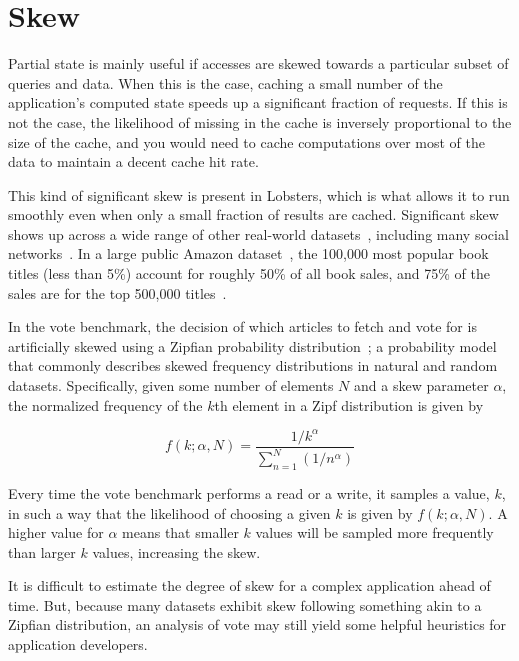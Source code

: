 \section{Skew}
\label{s:eval:patterns}

Partial state is mainly useful if accesses are skewed towards a particular
subset of queries and data. When this is the case, caching a small number of the
application's computed state speeds up a significant fraction of requests. If
this is not the case, the likelihood of missing in the cache is inversely
proportional to the size of the cache, and you would need to cache computations
over most of the data to maintain a decent cache hit rate.

This kind of significant skew is present in Lobsters, which is what allows it to
run smoothly even when only a small fraction of results are cached. Significant
skew shows up across a wide range of other real-world
datasets~\cite{power1,power2,network-skew,large-skew-analysis}, including many
social networks~\cite{network-skew2, community-skew}. In a large public Amazon
dataset~\cite{amazon-skew}, the 100,000 most popular book titles (less than 5\%)
account for roughly 50\% of all book sales, and 75\% of the sales are for the
top 500,000 titles~\cite{zhang2020permutation}.

In the vote benchmark, the decision of which articles to fetch and vote for is
artificially skewed using a Zipfian probability distribution~\cite{zipf}; a
probability model that commonly describes skewed frequency distributions in
natural and random datasets. Specifically, given some number of elements $N$ and
a skew parameter $\alpha$, the normalized frequency of the $k$th element in a
Zipf distribution is given by

\begin{displaymath}
  f\left(k;\alpha,N\right)={\frac {1/k^{\alpha}}{\sum \limits _{n=1}^{N}(1/n^{\alpha})}}
\end{displaymath}

Every time the vote benchmark performs a read or a write, it samples a value,
$k$, in such a way that the likelihood of choosing a given $k$ is given by
$f\left(k;\alpha,N\right)$. A higher value for $\alpha$ means that smaller $k$
values will be sampled more frequently than larger $k$ values, increasing the
skew.

It is difficult to estimate the degree of skew for a complex application ahead
of time. But, because many datasets exhibit skew following something akin to a
Zipfian distribution, an analysis of vote may still yield some helpful
heuristics for application developers.

